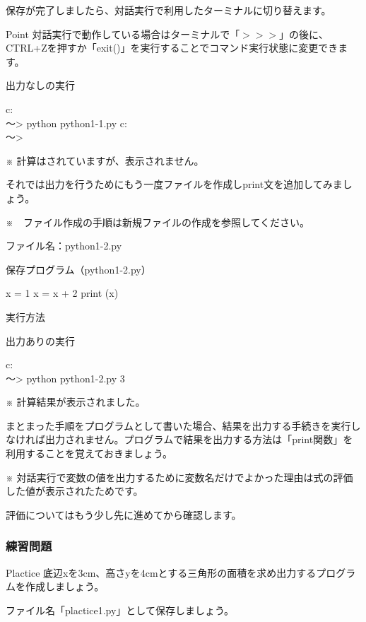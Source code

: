 \documentclass[11pt,a4paper,dvipdfmx,titlepage]{jsreport}
\begin{document}
保存が完了しましたら、{\gt 対話実行}で利用したターミナルに切り替えます。

\begin{hipoint}{Point}
{\gt 対話実行}で動作している場合はターミナルで「$>>>　$」の後に、CTRL+Zを押すか「exit()」を実行することでコマンド実行状態に変更できます。
\end{hipoint}
\begin{grabox}{出力なしの実行}
\begin{listing}{1}
c:\\～> python python1-1.py
c:\\～>
\end{listing}
\end{grabox}
※ 計算はされていますが、表示されません。

それでは出力を行うためにもう一度ファイルを作成しprint文を追加してみましょう。

※　ファイル作成の手順は新規ファイルの作成を参照してください。

ファイル名：python1-2.py
\begin{grabox}{保存プログラム（python1-2.py）}
\begin{listing}{1}
x = 1
x = x + 2
print (x)
\end{listing}
\end{grabox}

実行方法
\begin{grabox}{出力ありの実行}
\begin{listing}{1}
c:\\～> python python1-2.py
3
\end{listing}
\end{grabox}
※ 計算結果が表示されました。


まとまった手順をプログラムとして書いた場合、結果を出力する手続きを実行しなければ出力されません。プログラムで結果を出力する方法は「print関数」を利用することを覚えておきましょう。


※ {\gt 対話実行}で変数の値を出力するために変数名だけでよかった理由は式の評価した値が表示されたためです。

 評価についてはもう少し先に進めてから確認します。

\subsubsection{練習問題}
\begin{plabox}{Plactice}
底辺xを3cm、高さyを4cmとする三角形の面積を求め出力するプログラムを作成しましょう。

ファイル名「plactice1.py」として保存しましょう。
\end{plabox}
\end{document}
